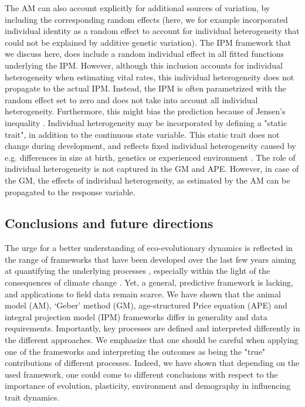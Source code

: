 The AM can also account explicitly for additional sources of variation, by including the corresponding random effects (here, we for example incorporated individual identity as a random effect to account for individual heterogeneity that could not be explained by additive genetic variation). The IPM framework that we discuss here, does include a random individual effect in all fitted functions underlying the IPM. However, although this inclusion accounts for individual heterogeneity when estimating vital rates, this individual heterogeneity does not propagate to the actual IPM. Instead, the IPM is often parametrized with the random effect set to zero and does not take into account all individual heterogeneity. Furthermore, this might bias the prediction because of Jensen's inequality \parencite[e.g.][]{Fox2002}. Individual heterogeneity may be incorporated by defining a "static trait", in addition to the continuous state variable. This static trait does not change during development, and reflects fixed individual heterogeneity caused by e.g. differences in size at birth, genetics or experienced environment \parencite[e.g.][]{Ellner2006,vindenes2015}. The role of individual heterogeneity is not captured in the GM and APE. However, in case of the GM, the effects of individual heterogeneity, as estimated by the AM can be propagated to the response variable.

\subsection*{Conclusions and future directions}
The urge for a better understanding of eco-evolutionary dynamics is reflected in the range of frameworks that have been developed over the last few years aiming at quantifying the underlying processes \parencite{Pelletier2009,Schoener2011}, especially within the light of the consequences of climate change \parencite{Gienapp2008,Lavergne2010}. Yet, a general, predictive framework is lacking, and applications to field data remain scarce. We have shown that the animal model (AM), `Geber' method (GM), age-structured Price equation (APE) and integral projection model (IPM) frameworks differ in generality and data requirements. Importantly, key processes are defined and interpreted differently in the different approaches. We emphasize that one should be careful when applying one of the frameworks and interpreting the outcomes as being the "true" contributions of different processes. Indeed, we have shown that depending on the used framework, one could come to different conclusions with respect to the importance of evolution, plasticity, environment and demography in influencing trait dynamics.

